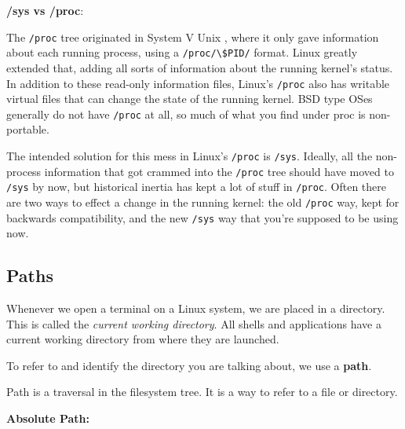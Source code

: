 \textbf{/sys vs /proc}:

The \lstinline|/proc| tree originated in System V Unix
, where it only gave information about each running process, using a
\lstinline|/proc/\$PID/| format. Linux greatly extended that, adding all sorts of information about the running kernel's status. In addition to these read-only information files, Linux's \lstinline|/proc| also has writable virtual files that can change the state of the running kernel.
BSD
type OSes generally do not have \lstinline|/proc| at all, so much of what you find under proc is non-portable.

The intended solution for this mess in Linux's \lstinline|/proc| is \lstinline|/sys|. Ideally, all the non-process information that got crammed into the \lstinline|/proc| tree should have moved to \lstinline|/sys| by now, but historical inertia has kept a lot of stuff in \lstinline|/proc|.
Often there are two ways to effect a change in the running kernel: the old \lstinline|/proc| way, kept for backwards compatibility, and the new \lstinline|/sys| way that you're supposed to be using now.

\subsection{Paths}

Whenever we open a terminal on a Linux system, we are placed in a directory.
This is called the \textit{current working directory}.
All shells and applications have a current working directory from where they are launched.

To refer to and identify the directory you are talking about, we use a \textbf{path}.

\begin{definition}[Path]
  Path is a traversal in the filesystem tree.
  It is a way to refer to a file or directory.
\end{definition}

\textbf{Absolute Path:}

